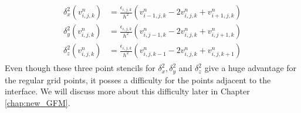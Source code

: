  \begin{eqnarray}
 \begin{aligned}
	\delta_x^2\left(v_{i,j,k}^n\right)&= \frac{\epsilon_{i,j,k}}{h^2} \left(v_{i-1,j,k}^n-2v_{i,j,k}^n+v_{i+1,j,k}^n\right) \\ \label{dif_opx}
	\delta_y^2\left(v_{i,j,k}^n\right)&= \frac{\epsilon_{i,j,k}}{h^2} \left(v_{i,j-1,k}^n-2v_{i,j,k}^n+v_{i,j+1,k}^n\right)\\ %
	\delta_z^2\left(v_{i,j,k}^n\right)&= \frac{\epsilon_{i,j,k}}{h^2} \left(v_{i,j,k-1}^n-2v_{i,j,k}^n+v_{i,j,k+1}^n\right) \label{dif_opz}
\end{aligned}
\end{eqnarray}
Even though these three point stencils for $\delta_x^2,\delta_y^2$ and $\delta_z^2$ give a huge advantage for the regular grid points, it posses a difficulty for the points adjacent to the interface. We will discuss more about this difficulty later in Chapter \ref{chap:new_GFM}.
  
